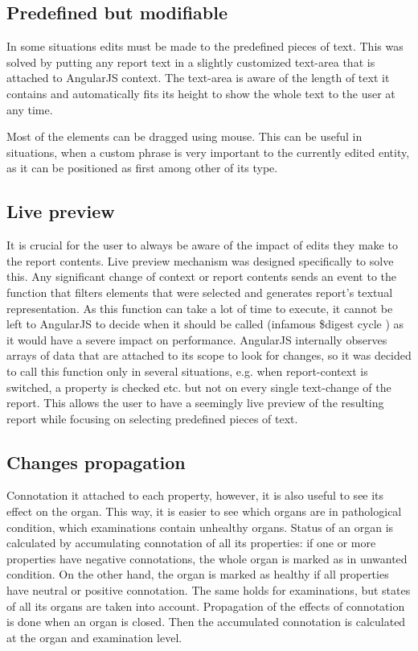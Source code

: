 \documentclass[12pt, twoside, openany]{report}
\theoremstyle{definition}
\begin{document}
\subsection{Predefined but modifiable}
In some situations edits must be made to the predefined pieces of text. This was solved by putting any report text in a slightly customized text-area that is attached to AngularJS context. The text-area is aware of the length of text it contains and automatically fits its height to show the whole text to the user at any time.

Most of the elements can be dragged using mouse. This can be useful in situations, when a custom phrase is very important to the currently edited entity, as it can be positioned as first among other of its type.


\subsection{Live preview}\label{live-preview}
It is crucial for the user to always be aware of the impact of edits they make to the report contents. Live preview mechanism was designed specifically to solve this. Any significant change of context or report contents sends an event to the function that filters elements that were selected and generates report's textual representation. As this function can take a lot of time to execute, it cannot be left to AngularJS to decide when it should be called (infamous \$digest cycle \cite{angular-digest}) as it would have a severe impact on performance. AngularJS internally observes arrays of data that are attached to its scope to look for changes, so it was decided to call this function only in several situations, e.g. when report-context is switched, a property is checked etc. but not on every single text-change of the report. This allows the user to have a seemingly live preview of the resulting report while focusing on selecting predefined pieces of text.

\subsection{Changes propagation}\label{changes-propagation}
Connotation it attached to each property, however, it is also useful to see its effect on the organ. This way, it is easier to see which organs are in pathological condition, which examinations contain unhealthy organs. Status of an organ is calculated by accumulating connotation of all its properties: if one or more properties have negative connotations, the whole organ is marked as in unwanted condition. On the other hand, the organ is marked as healthy if all properties have neutral or positive connotation.
The same holds for examinations, but states of all its organs are taken into account. Propagation of the effects of connotation is done when an organ is closed. Then the accumulated connotation is calculated at the organ and examination level.
\end{document}
